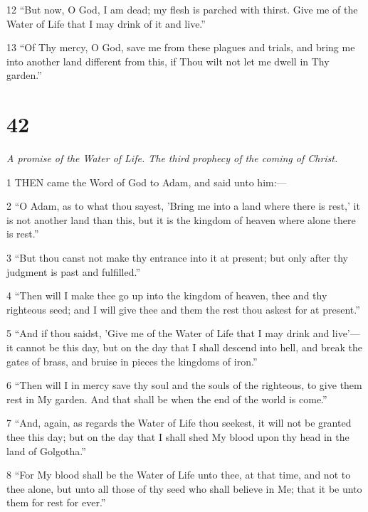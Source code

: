 \par 12 “But now, O God, I am dead; my flesh is parched with thirst. Give me of the Water of Life that I may drink of it and live.”

\par 13 “Of Thy mercy, O God, save me from these plagues and trials, and bring me into another land different from this, if Thou wilt not let me dwell in Thy garden.”

\chapter{42}

\par \textit{A promise of the Water of Life. The third prophecy of the coming of Christ.}

\par 1 THEN came the Word of God to Adam, and said unto him:—

\par 2 “O Adam, as to what thou sayest, 'Bring me into a land where there is rest,' it is not another land than this, but it is the kingdom of heaven where alone there is rest.”

\par 3 “But thou canst not make thy entrance into it at present; but only after thy judgment is past and fulfilled.”

\par 4 “Then will I make thee go up into the kingdom of heaven, thee and thy righteous seed; and I will give thee and them the rest thou askest for at present.”

\par 5 “And if thou saidst, 'Give me of the Water of Life that I may drink and live'—it cannot be this day, but on the day that I shall descend into hell, and break the gates of brass, and bruise in pieces the kingdoms of iron.”

\par 6 “Then will I in mercy save thy soul and the souls of the righteous, to give them rest in My garden. And that shall be when the end of the world is come.”

\par 7 “And, again, as regards the Water of Life thou seekest, it will not be granted thee this day; but on the day that I shall shed My blood upon thy head in the land of Golgotha.”

\par 8 “For My blood shall be the Water of Life unto thee, at that time, and not to thee alone, but unto all those of thy seed who shall believe in Me; that it be unto them for rest for ever.”

